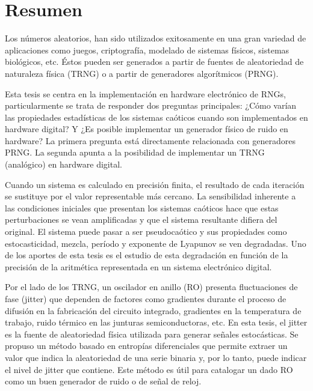 \chapter{Resumen}

Los números aleatorios, han sido utilizados exitosamente en una gran variedad de aplicaciones como juegos, criptografía, modelado de sistemas físicos, sistemas biológicos, etc.
Éstos pueden ser generados a partir de fuentes de aleatoriedad de naturaleza física (TRNG) o a partir de generadores algorítmicos (PRNG).

Esta tesis se centra en la implementación en hardware electrónico de RNGs, particularmente se trata de responder dos preguntas principales: ¿Cómo varían las propiedades estadísticas de los sistemas caóticos cuando son implementados en hardware digital? Y ¿Es posible implementar un generador físico de ruido en hardware? La primera pregunta está directamente relacionada con generadores PRNG.
La segunda apunta a la posibilidad de implementar un TRNG (analógico) en hardware digital.

Cuando un sistema es calculado en precisión finita, el resultado de cada iteración se sustituye por el valor representable más cercano.
La sensibilidad inherente a las condiciones iniciales que presentan los sistemas caóticos hace que estas perturbaciones se vean amplificadas y que el sistema resultante difiera del original.
El sistema puede pasar a ser pseudocaótico y sus propiedades como estocasticidad, mezcla, período y exponente de Lyapunov se ven degradadas.
Uno de los aportes de esta tesis es el estudio de esta degradación en función de la precisión de la aritmética representada en un sistema electrónico digital.

Por el lado de los TRNG, un oscilador en anillo (RO) presenta fluctuaciones de fase (jitter) que dependen de factores como gradientes durante el proceso de difusión en la fabricación del circuito integrado, gradientes en la temperatura de trabajo, ruido térmico en las junturas semiconductoras, etc.
En esta tesis, el jitter es la fuente de aleatoriedad física utilizada para generar señales estocásticas.
Se propuso un método basado en entropías diferenciales que permite extraer un valor que indica la aleatoriedad de una serie binaria y, por lo tanto, puede indicar el nivel de jitter que contiene.
Este método es útil para catalogar un dado RO como un buen generador de ruido o de señal de reloj.